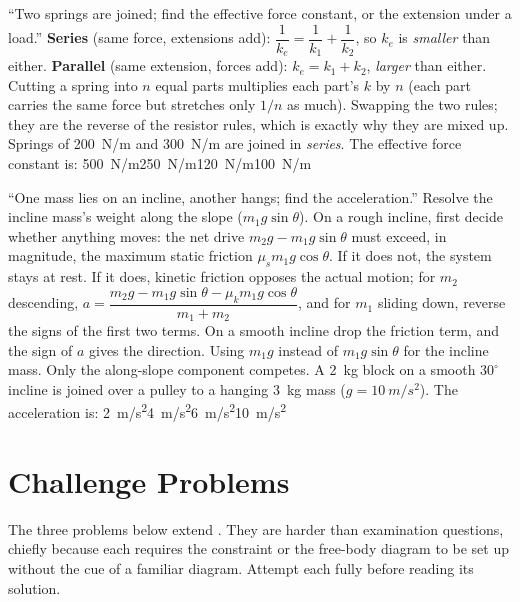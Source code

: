 {``Two springs are joined; find the effective force constant, or the extension under a load.''}
{\textbf{Series} (same force, extensions add): $\dfrac{1}{k_e}=\dfrac{1}{k_1}+\dfrac{1}{k_2}$, so
$k_e$ is \emph{smaller} than either. \textbf{Parallel} (same extension, forces add):
$k_e=k_1+k_2$, \emph{larger} than either. Cutting a spring into $n$ equal parts multiplies each
part's $k$ by $n$ (each part carries the same force but stretches only $1/n$ as much).}
{Swapping the two rules; they are the reverse of the resistor rules, which is exactly why they are
mixed up.}
{Springs of \SI{200}{N/m} and \SI{300}{N/m} are joined in \emph{series}. The effective force constant
is:}
{\SI{500}{N/m}}{\SI{250}{N/m}}{\SI{120}{N/m}}{\SI{100}{N/m}}

{``One mass lies on an incline, another hangs; find the acceleration.''}
{Resolve the incline mass's weight along the slope ($m_1g\sin\theta$). On a rough incline, first decide
whether anything moves: the net drive $m_2g-m_1g\sin\theta$ must exceed, in magnitude, the maximum static
friction $\mu_s m_1g\cos\theta$. If it does not, the system stays at rest. If it does, kinetic friction
opposes the actual motion; for $m_2$ descending,
$a=\dfrac{m_2g-m_1g\sin\theta-\mu_k m_1g\cos\theta}{m_1+m_2}$, and for $m_1$ sliding down, reverse the
signs of the first two terms. On a smooth incline drop the friction term, and the sign of $a$ gives the
direction.}
{Using $m_1g$ instead of $m_1g\sin\theta$ for the incline mass. Only the along-slope component competes.}
{A \SI{2}{kg} block on a smooth $30^\circ$ incline is joined over a pulley to a hanging \SI{3}{kg} mass
($g=\SI{10}{m/s^2}$). The acceleration is:}
{\SI{2}{m/s^2}}{\SI{4}{m/s^2}}{\SI{6}{m/s^2}}{\SI{10}{m/s^2}}

\section{Challenge Problems}\label{sec:challenge8}
The three problems below extend . They are harder than examination questions, chiefly
because each requires the constraint or the free-body diagram to be set up without the cue of a familiar
diagram. Attempt each fully before reading its solution.

